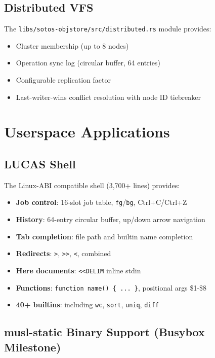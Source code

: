 \documentclass[11pt,letterpaper]{article}
\theoremstyle{definition}
\begin{document}
\subsection{Distributed VFS}

The \texttt{libs/sotos-objstore/src/distributed.rs} module provides:
\begin{itemize}[nosep]
    \item Cluster membership (up to 8 nodes)
    \item Operation sync log (circular buffer, 64 entries)
    \item Configurable replication factor
    \item Last-writer-wins conflict resolution with node ID tiebreaker
\end{itemize}

\section{Userspace Applications}
\label{sec:apps}

\subsection{LUCAS Shell}

The Linux-ABI compatible shell (3,700+ lines) provides:
\begin{itemize}[nosep]
    \item \textbf{Job control}: 16-slot job table, \texttt{fg}/\texttt{bg}, Ctrl+C/Ctrl+Z
    \item \textbf{History}: 64-entry circular buffer, up/down arrow navigation
    \item \textbf{Tab completion}: file path and builtin name completion
    \item \textbf{Redirects}: \texttt{>}, \texttt{>>}, \texttt{<}, combined
    \item \textbf{Here documents}: \texttt{<<DELIM} inline stdin
    \item \textbf{Functions}: \texttt{function name() \{ ... \}}, positional args \$1-\$8
    \item \textbf{40+ builtins}: including \texttt{wc}, \texttt{sort}, \texttt{uniq}, \texttt{diff}
\end{itemize}

\subsection{musl-static Binary Support (Busybox Milestone)}
\end{document}

